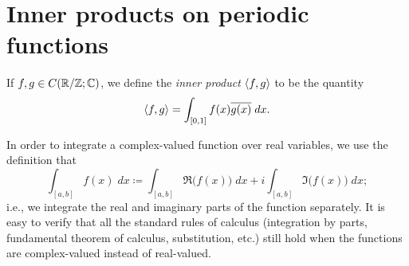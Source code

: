 \section{Inner products on periodic functions}\label{ii:sec:5.2}

\begin{defn}\label{ii:5.2.1}
  If \(f, g \in C(\R / \Z ; \C)\), we define the \emph{inner product} \(\inner*{f, g}\) to be the quantity
  \[
    \inner*{f, g} = \int_{[0, 1]} f(x) \overline{g(x)} \; dx.
  \]
\end{defn}

\begin{rmk}\label{ii:5.2.2}
  In order to integrate a complex-valued function over real variables, we use the definition that
  \[
    \int_{[a, b]} f(x) \; dx \coloneqq \int_{[a, b]} \Re\big(f(x)\big) \; dx + i \int_{[a,b]} \Im\big(f(x)\big) \; dx;
  \]
  i.e., we integrate the real and imaginary parts of the function separately.
  It is easy to verify that all the standard rules of calculus (integration by parts, fundamental theorem of calculus, substitution, etc.) still hold when the functions are complex-valued instead of real-valued.
\end{rmk}

